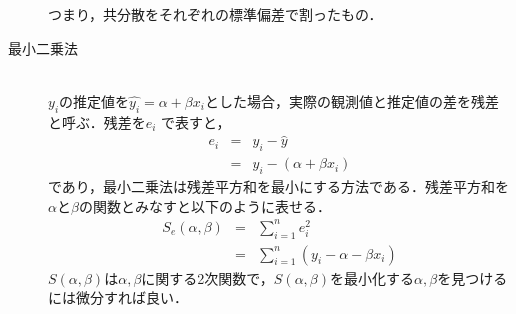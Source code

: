 \begin{description}
つまり，共分散をそれぞれの標準偏差で割ったもの．
\item[最小二乗法]\mbox{}\\
$y_i$の推定値を$\hat{y_i}=\alpha+\beta x_i$とした場合，実際の観測値と推定値の差を残差と呼ぶ．残差を$e_i$
で表すと，
\begin{eqnarray*}
e_i&=&y_i-\hat{y}\\
&=&y_i-\left( \alpha+\beta x_i \right)
\end{eqnarray*}
であり，最小二乗法は残差平方和を最小にする方法である．残差平方和を$\alpha$と$\beta$の関数とみなすと以下のように表せる．
\begin{eqnarray*}
S_e(\alpha,\beta)&=&\sum \limits ^n _{i=1}e_i ^2\\
&=&\sum \limits ^n _{i=1}\left( y_i-\alpha-\beta x_i \right)
\end{eqnarray*}
$S(\alpha,\beta)$は$\alpha,\beta$に関する2次関数で，$S(\alpha,\beta)$を最小化する$\alpha,\beta$を見つけるには微分すれば良い．


\end{description}
